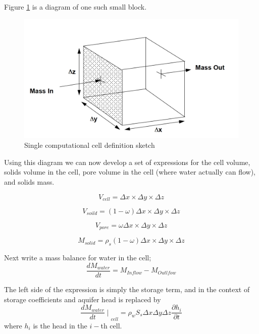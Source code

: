 Figure \ref{fig:single-computational-cell} is a diagram of one such small block.
\begin{figure}[h!] %
   \centering
   \includegraphics[width=6in]{./16-PorousMediumFlow/single-computational-cell.jpg} 
   \caption{Single computational cell definition sketch}
   \label{fig:single-computational-cell}
\end{figure}

Using this diagram we can now develop a set of expressions for the cell volume, solids volume in the cell,  pore volume in the cell (where water actually can flow), and solids mass.

\begin{equation}
V_{cell} = \Delta x \times \Delta y \times \Delta z
\end{equation}

\begin{equation}
V_{soild} =(1-\omega) \Delta x \times \Delta y \times \Delta z
\end{equation}

\begin{equation}
V_{pore} = \omega \Delta x \times \Delta y \times \Delta z
\end{equation}

\begin{equation}
M_{solid} = \rho_{s} (1-\omega) \Delta x \times \Delta y \times \Delta z
\end{equation}

Next write a mass balance for water in the cell;
\begin{equation}
\frac{d M_{water}}{dt} = M_{Inflow} - M_{Outlfow}
\end{equation}

The left side of the expression is simply the storage term, and in the context of storage coefficients and aquifer head is replaced by
\begin{equation}
{\frac{d M_{water}}{dt}\mid}_{cell} =\rho_{w} S_{s} \Delta x \Delta y \Delta z \frac{\partial h_i}{\partial t}
\end{equation}
 where $h_i$ is the head in the $i-$th cell.  
 
